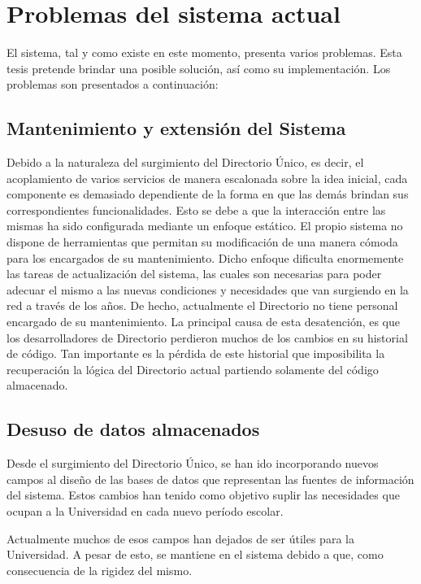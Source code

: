 \section{Problemas del sistema actual}

El sistema, tal y como existe en este momento, presenta varios problemas. Esta tesis 
pretende brindar una posible solución, así como su implementación. Los problemas son 
presentados a continuación:

\subsection{Mantenimiento y extensión del Sistema}

Debido a la naturaleza del surgimiento del Directorio Único, es decir, el acoplamiento 
de varios servicios de manera escalonada sobre la idea inicial, cada componente es 
demasiado dependiente de la forma en que las demás brindan sus correspondientes 
funcionalidades. Esto se debe a que la interacción entre las mismas ha sido configurada 
mediante un enfoque estático. El propio sistema no dispone de herramientas que permitan su 
modificación de una manera cómoda para los encargados de su mantenimiento. Dicho enfoque 
dificulta enormemente las tareas de actualización del sistema, las cuales son necesarias 
para poder adecuar el mismo a las nuevas condiciones y necesidades que van surgiendo en la 
red a través de los años. De hecho, actualmente el Directorio no tiene personal encargado
de su mantenimiento. La principal causa de esta desatención, es que los desarrolladores 
de Directorio perdieron muchos de los cambios en su historial de código. Tan importante es
la pérdida de este historial que imposibilita la recuperación la lógica del Directorio 
actual partiendo solamente del código almacenado.

\subsection{Desuso de datos almacenados}

Desde el surgimiento del Directorio Único, se han ido incorporando nuevos campos al 
diseño de las bases de datos que representan las fuentes de información del sistema. 
Estos cambios han tenido como objetivo suplir las necesidades que ocupan a la Universidad 
en cada nuevo período escolar. 

Actualmente muchos de esos campos han dejados de ser útiles para la Universidad.
A pesar de esto, se mantiene en el sistema debido a que, como consecuencia de la rigidez 
del mismo. 

